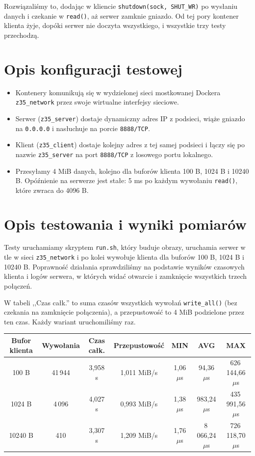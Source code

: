 \documentclass[12pt,a4paper]{article}
\begin{document}
Rozwiązaliśmy to, dodając w kliencie \texttt{shutdown(sock, SHUT\_WR)} po wysłaniu danych i czekanie w \texttt{read()}, aż serwer zamknie gniazdo. Od tej pory kontener klienta żyje, dopóki serwer nie doczyta wszystkiego, i wszystkie trzy testy przechodzą.


\section*{Opis konfiguracji testowej}

\begin{itemize}
    \item Kontenery komunikują się w wydzielonej sieci mostkowanej Dockera \texttt{z35\_network} przez swoje wirtualne interfejsy sieciowe.
    \item Serwer (\texttt{z35\_server}) dostaje dynamiczny adres IP z podsieci, wiąże gniazdo na \texttt{0.0.0.0} i nasłuchuje na porcie \texttt{8888/TCP}.
    \item Klient (\texttt{z35\_client}) dostaje kolejny adres z tej samej podsieci i łączy się po nazwie \texttt{z35\_server} na port \texttt{8888/TCP} z losowego portu lokalnego.
    \item Przesyłamy 4 MiB danych, kolejno dla buforów klienta 100 B, 1024 B i 10240 B. Opóźnienie na serwerze jest stałe: 5 ms po każdym wywołaniu \texttt{read()}, które zwraca do 4096 B.
\end{itemize}

\section*{Opis testowania i wyniki pomiarów}

Testy uruchamiamy skryptem \texttt{run.sh}, który buduje obrazy, uruchamia serwer w tle w sieci \texttt{z35\_network} i po kolei wywołuje klienta dla buforów 100 B, 1024 B i 10240 B. Poprawność działania sprawdziliśmy na podstawie wyników czasowych klienta i logów serwera, w których widać otwarcie i zamknięcie wszystkich trzech połączeń.

W tabeli ,,Czas całk.'' to suma czasów wszystkich wywołań \texttt{write\_all()} (bez czekania na zamknięcie połączenia), a przepustowość to 4 MiB podzielone przez ten czas. Każdy wariant uruchomiliśmy raz.

\begin{table}[H]
\centering
\footnotesize
\setlength{\tabcolsep}{4.5pt}
\begin{tabular}{|c|c|c|c|c|c|c|}
\hline
\textbf{Bufor klienta} & \textbf{Wywołania} & \textbf{Czas całk.} & \textbf{Przepustowość} & \textbf{MIN} & \textbf{AVG} & \textbf{MAX} \\
\hline
100 B & 41\,944 & 3,958 s & 1,011 MiB/s & 1,06 $\mu$s & 94,36 $\mu$s & 626\,144,66 $\mu$s \\
\hline
1024 B & 4\,096 & 4,027 s & 0,993 MiB/s & 1,38 $\mu$s & 983,24 $\mu$s & 435\,991,56 $\mu$s \\
\hline
10240 B & 410 & 3,307 s & 1,209 MiB/s & 1,76 $\mu$s & 8\,066,24 $\mu$s & 726\,118,70 $\mu$s \\
\hline
\end{tabular}
\end{table}
\end{document}
